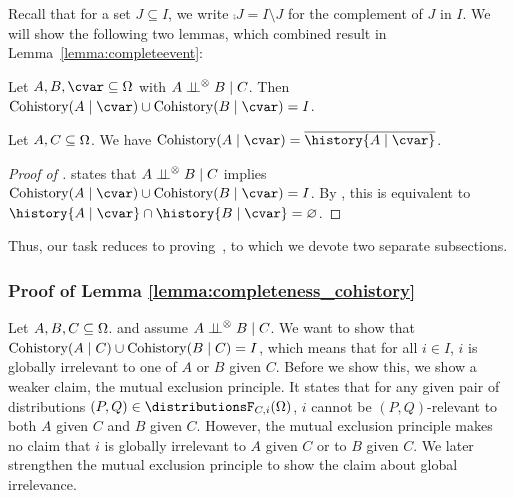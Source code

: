 \documentclass[USenglish,onecolumn]{article}
\begin{document}
Recall that for a set $J \subseteq I$, we write $\comp{J} = I \setminus J$ for the complement of $J$ in $I$.
We will show the following two lemmas, which combined result in Lemma~\ref{lemma:completeevent}:

\begin{lemma}
    \label{lemma:completeness_cohistory}
    Let $A,B,\cvar \subseteq \factors$ with $A \mathrel{\perp\!\!\!\perp}^\otimes B \mid C$.
    Then $\historyC(A \given \cvar) \union \historyC(B \given \cvar) = I$.
\end{lemma}

\begin{lemma}
    \label{lemma:cohistory_is_complement}
    Let $A,C \subseteq \Omega$.
    We have $\historyC(A \given \cvar)=\comp{\history{A \given \cvar}}$.
\end{lemma}



\begin{proof}[Proof of ]
\label{proof:completeevent2}
   states that $A \mathrel{\perp\!\!\!\perp}^\otimes B \mid C$ implies $\historyC(A \given \cvar) \union \historyC(B \given \cvar) = I$.
  By ,
  this is equivalent to $\history{A \given \cvar} \sect \history{B \given \cvar} = \nothing$.
\end{proof}

Thus, our task reduces to proving~, to which we devote two separate subsections.

\subsubsection{Proof of Lemma \ref{lemma:completeness_cohistory}}

Let $A, B, C \subseteq \Omega$.
and assume $A \mathrel{\perp\!\!\!\perp}^\otimes B \mid C$.
We want to show that $\operatorname{Cohistory}(A \mid C) \cup \operatorname{Cohistory}(B \mid C) = I$, which means that for all $i \in I$, $i$ is globally irrelevant to one of $A$ or $B$ given $C$. 
Before we show this, we show a weaker claim, the mutual exclusion principle. It states that for any given pair of distributions $(P,Q)\in\distributionsF_{C, i}(\Omg)$,  $i$ cannot be $(P,Q)$-relevant to both $A$ given $C$ and $B$ given $C$. However, the mutual exclusion principle makes no claim that $i$ is globally irrelevant to $A$ given $C$ or to $B$ given $C$.
We later strengthen the mutual exclusion principle to show the claim about global irrelevance.
\end{document}
